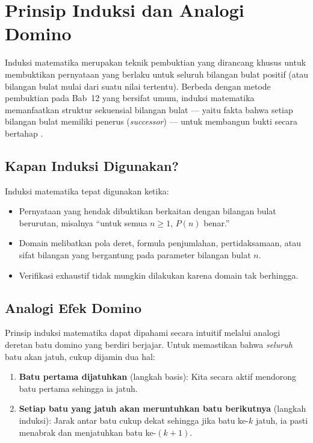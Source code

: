 \section{Prinsip Induksi dan Analogi Domino}

Induksi matematika merupakan teknik pembuktian yang dirancang khusus untuk membuktikan pernyataan yang berlaku untuk seluruh bilangan bulat positif (atau bilangan bulat mulai dari suatu nilai tertentu). Berbeda dengan metode pembuktian pada Bab~12 yang bersifat umum, induksi matematika memanfaatkan struktur sekuensial bilangan bulat --- yaitu fakta bahwa setiap bilangan bulat memiliki penerus (\textit{successor}) --- untuk membangun bukti secara bertahap \cite{rosen2019}.

\subsection{Kapan Induksi Digunakan?}

Induksi matematika tepat digunakan ketika:
\begin{itemize}
    \item Pernyataan yang hendak dibuktikan berkaitan dengan bilangan bulat berurutan, misalnya ``untuk semua $n \geq 1$, $P(n)$ benar.''
    \item Domain melibatkan pola deret, formula penjumlahan, pertidaksamaan, atau sifat bilangan yang bergantung pada parameter bilangan bulat $n$.
    \item Verifikasi exhaustif tidak mungkin dilakukan karena domain tak berhingga.
\end{itemize}

\subsection{Analogi Efek Domino}

Prinsip induksi matematika dapat dipahami secara intuitif melalui analogi deretan batu domino yang berdiri berjajar. Untuk memastikan bahwa \emph{seluruh} batu akan jatuh, cukup dijamin dua hal:

\begin{enumerate}
    \item \textbf{Batu pertama dijatuhkan} (langkah basis): Kita secara aktif mendorong batu pertama sehingga ia jatuh.
    \item \textbf{Setiap batu yang jatuh akan meruntuhkan batu berikutnya} (langkah induksi): Jarak antar batu cukup dekat sehingga jika batu ke-$k$ jatuh, ia pasti menabrak dan menjatuhkan batu ke-$(k+1)$.
\end{enumerate}


